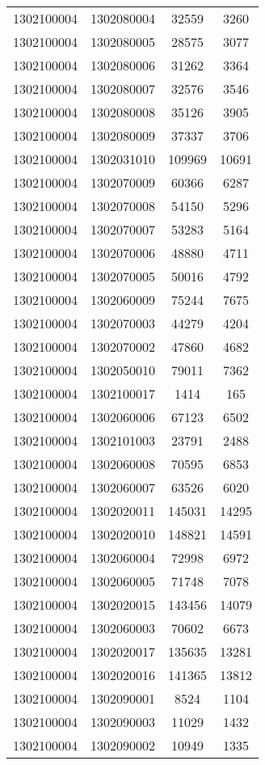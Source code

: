 \begin{longtable}[h]{llcc}
		1302100004 & 1302080004 & 32559 & 3260\\
		1302100004 & 1302080005 & 28575 & 3077\\
		1302100004 & 1302080006 & 31262 & 3364\\
		1302100004 & 1302080007 & 32576 & 3546\\
		1302100004 & 1302080008 & 35126 & 3905\\
		1302100004 & 1302080009 & 37337 & 3706\\
		1302100004 & 1302031010 & 109969 & 10691\\
		1302100004 & 1302070009 & 60366 & 6287\\
		1302100004 & 1302070008 & 54150 & 5296\\
		1302100004 & 1302070007 & 53283 & 5164\\
		1302100004 & 1302070006 & 48880 & 4711\\
		1302100004 & 1302070005 & 50016 & 4792\\
		1302100004 & 1302060009 & 75244 & 7675\\
		1302100004 & 1302070003 & 44279 & 4204\\
		1302100004 & 1302070002 & 47860 & 4682\\
		1302100004 & 1302050010 & 79011 & 7362\\
		1302100004 & 1302100017 & 1414 & 165\\
		1302100004 & 1302060006 & 67123 & 6502\\
		1302100004 & 1302101003 & 23791 & 2488\\
		1302100004 & 1302060008 & 70595 & 6853\\
		1302100004 & 1302060007 & 63526 & 6020\\
		1302100004 & 1302020011 & 145031 & 14295\\
		1302100004 & 1302020010 & 148821 & 14591\\
		1302100004 & 1302060004 & 72998 & 6972\\
		1302100004 & 1302060005 & 71748 & 7078\\
		1302100004 & 1302020015 & 143456 & 14079\\
		1302100004 & 1302060003 & 70602 & 6673\\
		1302100004 & 1302020017 & 135635 & 13281\\
		1302100004 & 1302020016 & 141365 & 13812\\
		1302100004 & 1302090001 & 8524 & 1104\\
		1302100004 & 1302090003 & 11029 & 1432\\
		1302100004 & 1302090002 & 10949 & 1335\\

\end{longtable}
